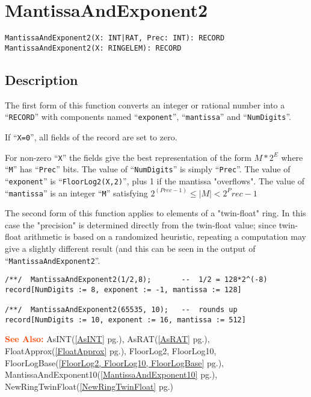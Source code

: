 \documentclass[a4paper]{mybook}
\newenvironment{command}{}{} %
\newcommand\SeeAlso{\par\textcolor{OrangeRed}{\textbf{\large See Also: }}}
\begin{document}
\section{MantissaAndExponent2}
\label{MantissaAndExponent2}
\begin{command} %


\begin{Verbatim}[label=syntax, rulecolor=\color{MidnightBlue},
frame=single]
MantissaAndExponent2(X: INT|RAT, Prec: INT): RECORD
MantissaAndExponent2(X: RINGELEM): RECORD
\end{Verbatim}


\subsection*{Description}

The first form of this function converts an integer or rational number into a ``\verb&RECORD&'' with components
named ``\verb&exponent&'', ``\verb&mantissa&'' and ``\verb&NumDigits&''.
\par 
If ``\verb&X=0&'', all fields of the record are set to zero.
\par 
For non-zero ``\verb&X&'' the fields give the best representation of the form $M*2^E$
where ``\verb&M&'' has ``\verb&Prec&'' bits.
The value of ``\verb&NumDigits&'' is simply ``\verb&Prec&''.
The value of ``\verb&exponent&'' is ``\verb&FloorLog2(X,2)&'', plus 1 if the mantissa "overflows".
The value of ``\verb&mantissa&'' is an integer ``\verb&M&'' satisfying $2^(Prec-1) \le  |M| < 2^Prec-1$
\par 
The second form of this function applies to elements of a "twin-float"
ring.  In this case the "precision" is determined directly from the
twin-float value; since twin-float arithmetic is based on a randomized
heuristic, repeating a computation may give a slightly different result
(and this can be seen in the output of ``\verb&MantissaAndExponent2&''.
\begin{Verbatim}[label=example, rulecolor=\color{PineGreen}, frame=single]
/**/  MantissaAndExponent2(1/2,8);       --  1/2 = 128*2^(-8)
record[NumDigits := 8, exponent := -1, mantissa := 128]

/**/  MantissaAndExponent2(65535, 10);   --  rounds up
record[NumDigits := 10, exponent := 16, mantissa := 512]
\end{Verbatim}


\SeeAlso %
  AsINT(\ref{AsINT} pg.\pageref{AsINT}), 
    AsRAT(\ref{AsRAT} pg.\pageref{AsRAT}), 
    FloatApprox(\ref{FloatApprox} pg.\pageref{FloatApprox}), 
    FloorLog2, FloorLog10, FloorLogBase(\ref{FloorLog2, FloorLog10, FloorLogBase} pg.\pageref{FloorLog2, FloorLog10, FloorLogBase}), 
    MantissaAndExponent10(\ref{MantissaAndExponent10} pg.\pageref{MantissaAndExponent10}), 
    NewRingTwinFloat(\ref{NewRingTwinFloat} pg.\pageref{NewRingTwinFloat})
\end{command} %
\end{document}
